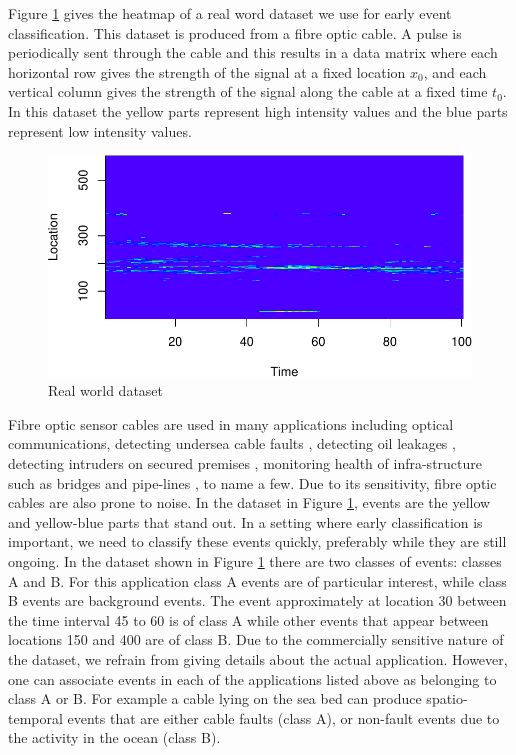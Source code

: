 \documentclass[11pt]{article}
\begin{document}
	Figure \ref{fig:Real_World_Data} gives the heatmap of a real word dataset we use for early event classification. This dataset is produced from a fibre optic  cable. A pulse is periodically sent through the cable and this results in a data matrix where each horizontal row gives the strength of the signal at a fixed location $x_0$, and each vertical column gives the strength of the signal along the cable at a fixed time $t_0$.  In this dataset the yellow parts represent high intensity values and the blue parts represent low intensity values. 
	
	\begin{figure}[H]
	\centering
	\includegraphics{./Graphics/Real_World.pdf}  %
	\caption{\footnotesize Real world dataset}
	\label{fig:Real_World_Data}
	\end{figure}
	
	Fibre optic sensor cables are used in many applications including optical communications, detecting undersea cable faults \cite{jiang2009technological}, detecting oil leakages \cite{nikles2004leakage}, detecting intruders on secured premises \cite{griffiths1995developments}, monitoring health of infra-structure such as bridges and pipe-lines \cite{li2004recent}, to name a few. Due to its sensitivity, fibre optic cables are also prone to noise. In the dataset in Figure \ref{fig:Real_World_Data}, events are the yellow and yellow-blue parts that stand out. In a setting where early classification is  important, we need to classify these events quickly, preferably while they are still ongoing. In the dataset shown in Figure \ref{fig:Real_World_Data} there are two classes of events: classes A and B. For this application class A events are of particular interest, while class B events are background events.  The event approximately at location 30 between the time interval  45 to 60 is of class A while other events that appear between locations 150 and 400  are of class B. Due to the commercially sensitive nature of the dataset, we refrain from giving details about the actual application. However, one can associate events in each of the applications listed above as belonging to class A or B. For example a cable lying on the sea bed can produce spatio-temporal events that are either cable faults (class A), or non-fault events due to the activity in the ocean (class B). 
	
\end{document}
